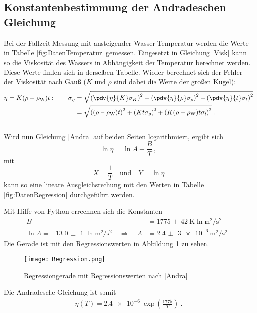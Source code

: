 \subsection{Konstantenbestimmung der Andradeschen Gleichung}
Bei der Fallzeit-Messung mit ansteigender Wasser-Temperatur werden die Werte in Tabelle \ref{fig:DatenTemperatur} gemessen. Eingesetzt in Gleichung \eqref{Visk} kann so die Viskosität des Wassers in Abhängigkeit der Temperatur berechnet werden. Diese Werte finden sich in derselben Tabelle. Wieder berechnet sich der Fehler der Viskosität nach Gauß ($K$ und $\rho$ sind dabei die Werte der großen Kugel):
\begin{align}
	\eta = K(\rho-\rho_\text{W})t: \qquad \sigma_{\eta} &= \sqrt{\left(\pdv{\eta}{K}\sigma_K\right)^2+\left(\pdv{\eta}{\rho}\sigma_{\rho}\right)^2 + \left(\pdv{\eta}{t}\sigma_{t}\right)^2} \\
	&= \sqrt{\left((\rho-\rho_\text{W})t\right)^2+\left(Kt\sigma_\rho\right)^2+\left(K(\rho-\rho_\text{W})t\sigma_t\right)^2} \ .
\end{align}
 \\
Wird nun Gleichung \eqref{Andra} auf beiden Seiten logarithmiert, ergibt sich
\[ \ln\eta = \ln A + \frac{B}{T} \ , \]
mit
\[ X = \frac{1}{T} \quad \text{und} \quad Y = \ln\eta \]
kann so eine lineare Ausgleichsrechung mit den Werten in Tabelle \ref{fig:DatenRegression} durchgeführt werden.

Mit Hilfe von Python errechnen sich die Konstanten
\begin{align}
	B &= \SI{1775(42)}{\kelvin\ln\metre\squared\per\second\squared} \\
	\ln A = \SI{-13.0(1)}{\ln\metre\squared\per\second\squared} \quad \Rightarrow \quad A &= \SI{2.4(3)e-6}{\metre\squared\per\second\squared} \ .
\end{align}
Die Gerade ist mit den Regressionswerten in Abbildung \ref{fig:Regression} zu sehen.
\begin{figure}[h!]
	\centering
	\texttt{[image: Regression.png]}
	\caption{Regressiongerade mit Regressionswerten nach \eqref{Andra}}
	\label{fig:Regression}
\end{figure}
Die Andradesche Gleichung ist somit
\begin{align}
	\eta(T) = \SI{2.4e-6}{}\exp\left(\frac{1775}{T}\right) \ .
\end{align}
\clearpage


